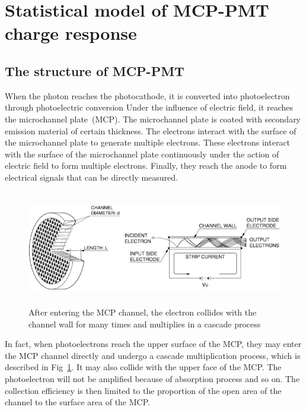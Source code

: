 \documentclass{article}
\begin{document}
\section{Statistical model of MCP-PMT charge response}
\subsection{The structure of MCP-PMT}\label{subsec:structure}
When the photon reaches the photocathode, it is converted into photoelectron through photoelectric conversion
Under the influence of electric field, it reaches the microchannel plate~(MCP). The microchannel plate is coated
with secondary emission material of certain thickness. The electrons interact with the surface of the microchannel plate to generate multiple electrons.
These electrons interact with the surface of the microchannel plate continuously under the action of electric field to form multiple electrons.
Finally, they reach the anode to form electrical signals that can be directly measured.
\begin{figure}[ht]
    \centering
    \includegraphics[height=5cm]{pic/structure.pdf}
    \caption{After entering the MCP channel, the electron collides with the channel wall for many times and multiplies in a cascade process}\label{fig:structure}
\end{figure}

In fact, when photoelectrons reach the upper surface of the MCP,
they may enter the MCP channel directly and undergo a cascade multiplication process,
which is described in Fig~\ref{fig:structure}.
It may also collide with the upper face of the MCP.\@
The photoelectron will not be amplified because of absorption process and so on.
The collection efficiency is then limited to the proportion of the open area of
the channel to the surface area of the MCP.\@
\end{document}
